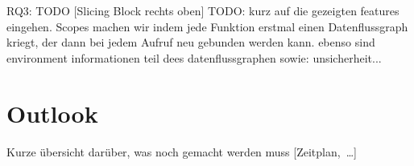 \begin{frame}[c]{RQ3: TODO [Slicing Block rechts oben]}
   \centering
   TODO: kurz auf die gezeigten features eingehen.
   Scopes machen wir indem jede Funktion erstmal einen Datenflussgraph kriegt, der dann bei jedem Aufruf neu gebunden werden kann. ebenso sind environment informationen teil dees datenflussgraphen
   sowie: unsicherheit...
\end{frame}


\section{Outlook}
\begin{frame}{Kurze übersicht darüber, was noch gemacht werden muss}
   [Zeitplan,~\ldots]
\end{frame}